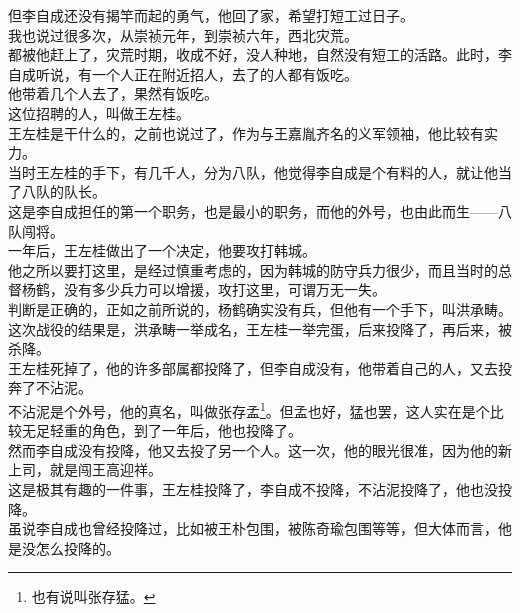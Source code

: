 \begin{multicols}{\theparacolNo}
但李自成还没有揭竿而起的勇气，他回了家，希望打短工过日子。\\

我也说过很多次，从崇祯元年，到崇祯六年，西北灾荒。\\

都被他赶上了，灾荒时期，收成不好，没人种地，自然没有短工的活路。此时，李自成听说，有一个人正在附近招人，去了的人都有饭吃。\\

他带着几个人去了，果然有饭吃。\\

这位招聘的人，叫做王左桂。\\

王左桂是干什么的，之前也说过了，作为与王嘉胤齐名的义军领袖，他比较有实力。\\

当时王左桂的手下，有几千人，分为八队，他觉得李自成是个有料的人，就让他当了八队的队长。\\

这是李自成担任的第一个职务，也是最小的职务，而他的外号，也由此而生——八队闯将。\\

一年后，王左桂做出了一个决定，他要攻打韩城。\\

他之所以要打这里，是经过慎重考虑的，因为韩城的防守兵力很少，而且当时的总督杨鹤，没有多少兵力可以增援，攻打这里，可谓万无一失。\\

判断是正确的，正如之前所说的，杨鹤确实没有兵，但他有一个手下，叫洪承畴。\\

这次战役的结果是，洪承畴一举成名，王左桂一举完蛋，后来投降了，再后来，被杀降。\\

王左桂死掉了，他的许多部属都投降了，但李自成没有，他带着自己的人，又去投奔了不沾泥。\\

不沾泥是个外号，他的真名，叫做张存孟\footnote{也有说叫张存猛。}。但孟也好，猛也罢，这人实在是个比较无足轻重的角色，到了一年后，他也投降了。\\

然而李自成没有投降，他又去投了另一个人。这一次，他的眼光很准，因为他的新上司，就是闯王高迎祥。\\

这是极其有趣的一件事，王左桂投降了，李自成不投降，不沾泥投降了，他也没投降。\\

虽说李自成也曾经投降过，比如被王朴包围，被陈奇瑜包围等等，但大体而言，他是没怎么投降的。\\


\end{multicols}

